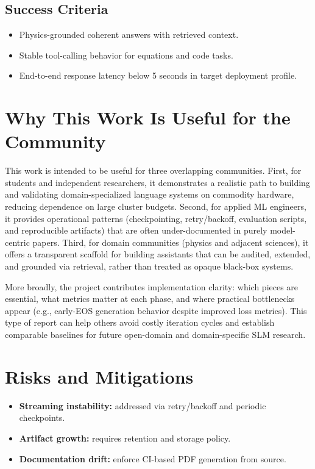 \documentclass[11pt]{article}
\begin{document}
\subsection{Success Criteria}
\begin{itemize}[leftmargin=*]
    \item Physics-grounded coherent answers with retrieved context.
    \item Stable tool-calling behavior for equations and code tasks.
    \item End-to-end response latency below 5 seconds in target deployment profile.
\end{itemize}

\section{Why This Work Is Useful for the Community}
This work is intended to be useful for three overlapping communities. First, for students and independent researchers, it demonstrates a realistic path to building and validating domain-specialized language systems on commodity hardware, reducing dependence on large cluster budgets. Second, for applied ML engineers, it provides operational patterns (checkpointing, retry/backoff, evaluation scripts, and reproducible artifacts) that are often under-documented in purely model-centric papers. Third, for domain communities (physics and adjacent sciences), it offers a transparent scaffold for building assistants that can be audited, extended, and grounded via retrieval, rather than treated as opaque black-box systems.

More broadly, the project contributes implementation clarity: which pieces are essential, what metrics matter at each phase, and where practical bottlenecks appear (e.g., early-EOS generation behavior despite improved loss metrics). This type of report can help others avoid costly iteration cycles and establish comparable baselines for future open-domain and domain-specific SLM research.

\section{Risks and Mitigations}
\begin{itemize}[leftmargin=*]
    \item \textbf{Streaming instability:} addressed via retry/backoff and periodic checkpoints.
    \item \textbf{Artifact growth:} requires retention and storage policy.
    \item \textbf{Documentation drift:} enforce CI-based PDF generation from source.
\end{itemize}
\end{document}
